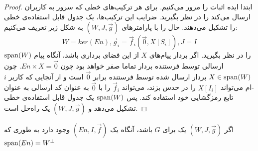 \begin{proof}
    ابتدا ایده اثبات را مرور می‌کنیم. برای هر 
    \lpicod
    ترکیب‌های خطی که سرور به کاربران ارسال می‌کند را در نظر بگیرید. ضرایب این ترکیب‌ها، یک جدول قابل استفاده‌ی خطی را تشکیل می‌دهند.
حال
    \lpsicod
    را با پارامترهای
    $(W, J, \overrightarrow{g})$
     به شکل زیر تعریف می‌کنیم:
     $$W = ker(En), \overrightarrow{g}_i = \overrightarrow{f}_i(\overrightarrow{0}, X[S_i]), J = I$$
    $\operatorname{span}(W)$
     را در نظر بگیرید. اگر بردار پیام‌های
     $X$
      از این فضای برداری باشد، آنگاه پیام ارسالی توسط فرستنده بردار تماما صفر خواهد بود چون 
      $En \times X = \overrightarrow{0}$.
      چون
      $X \in \operatorname{span}(W)$
       بردار ارسال شده توسط فرستنده برابر
      $\overrightarrow{0}$
       است و از آنجایی که کاربر 
       $i$-ام
        می‌تواند 
       $X[I_i]$
        را در 
        \picod
         حدس بزند، می‌تواند
         $\overrightarrow{f}_i$ 
        را با 
        $\overrightarrow{0}$ 
        به عنوان کد ارسالی به عنوان تابع رمزگشایی خود استفاده کند. پس 
        $\operatorname{span}(W)$
         یک جدول قابل استفاده‌ی خطی تشکیل می‌دهد و 
        $(W, J, \overrightarrow{g})$ 
        یک راه‌حل است.
\end{proof}

\begin{lemma}
    اگر
     $(W, J, \overrightarrow{g})$
      یک 
      \lpsicod
       برای $G$ باشد، آنگاه یک
       \lpicod
        $(En, I, \overrightarrow{f})$
        وجود دارد به طوری که
         $\operatorname{span}(En) = W^{\bot}$
\end{lemma}

